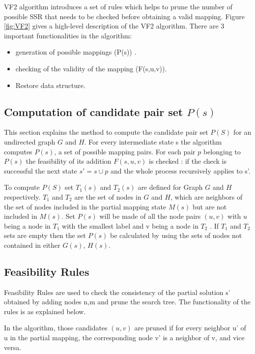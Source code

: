 VF2 algorithm introduces a set of rules which helps to prune the number of possible SSR that needs to be checked before obtaining a valid mapping. Figure \ref{fig:VF2} gives a high-level description of the VF2 algorithm.
There are 3 important functionalities in the algorithm: 
\begin{itemize}
\item generation of possible mappings (P(s)) .
\item checking of the validity of the mapping (F(s,u,v)).
\item Restore data structure.
\end{itemize}



\subsection{Computation of candidate pair set $P(s)$}
This section explains the method to compute the candidate pair set $P(S)$ for an undirected graph $G$ and $H$. 
For every intermediate state s the algorithm computes $P(s)$, a set of possible mapping pairs. For each pair $p$ belonging to $P(s)$ the feasibility of its addition $F(s,u,v)$ is checked : if the check is successful the next state $s' = s \cup p$ and the whole process recursively applies to s'.

To compute $P(S)$ set $T_1(s)$ and $T_2(s)$ are defined for Graph $G$ and $H$ respectively. $T_1$ and $T_2$ are the set of  nodes in $G$ and $H$, which are neighbors of the set of nodes included in the partial mapping state $M(s)$ but are not included in $M(s)$.
Set $P(s)$ will be made of all the node pairs $(u,v)$ with $u$ being a node in $T_1$ with the smallest label  and v being a node in $T_2$ . If  $T_1$ and $T_2$ sets are empty then the set $P(s)$ be calculated by using the sets of nodes not contained in either $G(s)$, $H(s)$.

\subsection{Feasibility Rules}
Feasibility Rules are used to check the consistency of the partial solution s' obtained by adding nodes n,m and prune the search tree. The functionality of the rules is as explained below.

In the algorithm, those candidates $(u,v)$ are pruned if for every neighbor u' of u in the partial mapping, the corresponding node v' is a neighbor of v, and vice versa.

